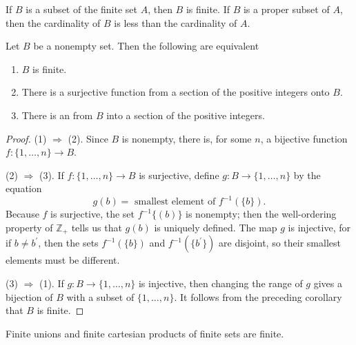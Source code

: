 \begin{corollary}
\label{cor:\thetheorem}
 If \(B\) is a subset of the finite set \(A\), then \(B\) is finite. If \(B\) is a proper subset of \(A\), then the cardinality of \(B\) is less than the cardinality of \(A\).
\end{corollary}

\begin{corollary}
\label{cor:\thetheorem}
 Let \(B\) be a nonempty set. Then the following are equivalent

 \begin{enumerate}[itemsep=0.2em, parsep=0pt, topsep=0pt, partopsep=0pt, leftmargin=*, label=(\arabic*), align=left]
 \item \(B\) is finite.

 \item There is a surjective function from a section of the positive integers onto \(B\).

 \item There is an  from \(B\) into a section of the positive integers.
 \end{enumerate}
\end{corollary}

\begin{proof}
 (1) \(\Rightarrow\) (2). Since \(B\) is nonempty, there is, for some \(n\), a bijective function \(f : \{1,\ldots, n\} \rightarrow B\).

 (2) \(\Rightarrow\) (3). If \(f : \{1,\ldots, n\} \rightarrow B\) is surjective, define \(g : B \rightarrow \{1,\ldots, n\}\) by the equation
 \[
 g(b) = \text{ smallest element of }f^{-1}({\{ b\} }).
 \]
 Because \(f\) is surjective, the set \(f^{-1}\{ (b) \}\) is nonempty; then the well-ordering property of \(\mathbb{Z}_{+}\) tells us that \(g(b)\) is uniquely defined. The map \(g\) is injective, for if \(b \neq {b}^{\prime }\), 
 then the sets \(f^{-1}({\{ b\} })\) and \(f^{-1}( \{ b^{\prime }\} )\) are disjoint, so their smallest elements must be different.

 (3) \(\Rightarrow\) (1). If \(g : B \rightarrow \{1,\ldots, n\}\) is injective, then changing the range of \(g\) gives a bijection of \(B\) with a subset of \(\{1,\ldots, n\}\). It follows from the preceding corollary that \(B\) is finite.
\end{proof}

\begin{corollary}
\label{cor:\thetheorem}
 Finite unions and finite cartesian products of finite sets are finite.
\end{corollary}

